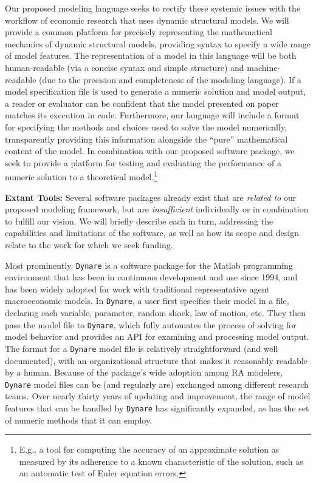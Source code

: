 \documentclass[12pt,pdftex,letterpaper]{article}
\begin{document}
Our proposed modeling language seeks to rectify these systemic issues with the workflow of economic research that uses dynamic structural models. We will provide a common platform for precisely representing the mathematical mechanics of dynamic structural models, providing syntax to specify a wide range of model features. The representation of a model in this language will be both human-readable (via a concise syntax and simple structure) and machine-readable (due to the precision and completeness of the modeling language). If a model specification file is used to generate a numeric solution and model output, a reader or evaluator can be confident that the model presented on paper matches its execution in code. Furthermore, our language will include a format for specifying the methods and choices used to solve the model numerically, transparently providing this information alongside the ``pure'' mathematical content of the model. In combination with our proposed software package, we seek to provide a platform for testing and evaluating the performance of a numeric solution to a theoretical model.\footnote{E.g., a tool for computing the accuracy of an approximate solution as measured by its adherence to a known characteristic of the solution, such as an automatic test of Euler equation errors.}

\vspace{0.5cm}

\noindent \textbf{Extant Tools:} Several software packages already exist that are \textit{related to} our proposed modeling framework, but are \textit{insufficient} individually or in combination to fulfill our vision. We will briefly describe each in turn, addressing the capabilities and limitations of the software, as well as how its scope and design relate to the work for which we seek funding.

Most prominently, \texttt{Dynare} is a software package for the Matlab programming environment that has been in continuous development and use since 1994, and has been widely adopted for work with traditional representative agent macroeconomic models. In \texttt{Dynare}, a user first specifies their model in a file, declaring each variable, parameter, random shock, law of motion, etc. They then pass the model file to \texttt{Dynare}, which fully automates the process of solving for model behavior and provides an API for examining and processing model output. The format for a \texttt{Dynare} model file is relatively straightforward (and well documented), with an organizational structure that makes it reasonably readable by a human. Because of the package's wide adoption among RA modelers, \texttt{Dynare} model files can be (and regularly are) exchanged among different research teams. Over nearly thirty years of updating and improvement, the range of model features that can be handled by \texttt{Dynare} has significantly expanded, as has the set of numeric methods that it can employ.
\end{document}
